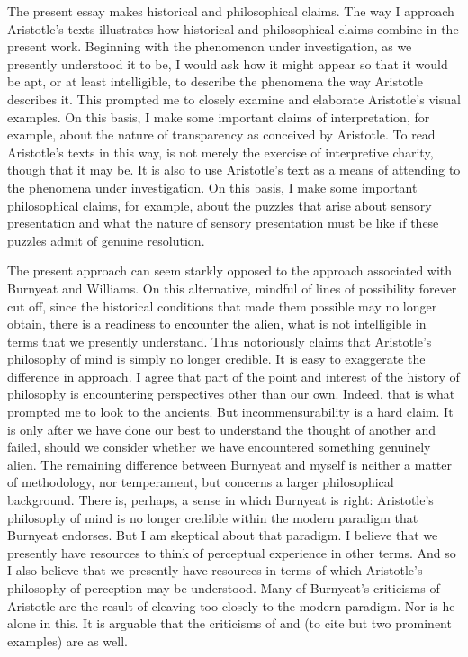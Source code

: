 The present essay makes historical and philosophical claims. The way I approach Aristotle's texts illustrates how historical and philosophical claims combine in the present work. Beginning with the phenomenon under investigation, as we presently understood it to be, I would ask how it might appear so that it would be apt, or at least intelligible, to describe the phenomena the way Aristotle describes it. This prompted me to closely examine and elaborate Aristotle's visual examples. On this basis, I make some important claims of interpretation, for example, about the nature of transparency as conceived by Aristotle. To read Aristotle's texts in this way, is not merely the exercise of interpretive charity, though that it may be. It is also to use Aristotle's text as a means of attending to the phenomena under investigation. On this basis, I make some important philosophical claims, for example, about the puzzles that arise about sensory presentation and what the nature of sensory presentation must be like if these puzzles admit of genuine resolution.

The present approach can seem starkly opposed to the approach associated with Burnyeat and Williams. On this alternative, mindful of lines of possibility forever cut off, since the historical conditions that made them possible may no longer obtain, there is a readiness to encounter the alien, what is not intelligible in terms that we presently understand. Thus \citet{Burnyeat:1992fk} notoriously claims that Aristotle's philosophy of mind is simply no longer credible. It is easy to exaggerate the difference in approach. I agree that part of the point and interest of the history of philosophy is encountering perspectives other than our own. Indeed, that is what prompted me to look to the ancients. But incommensurability is a hard claim. It is only after we have done our best to understand the thought of another and failed, should we consider whether we have encountered something genuinely alien. The remaining difference between Burnyeat and myself is neither a matter of methodology, nor temperament, but concerns a larger philosophical background. There is, perhaps, a sense in which Burnyeat is right: Aristotle's philosophy of mind is no longer credible within the modern paradigm that Burnyeat endorses. But I am skeptical about that paradigm. I believe that we presently have resources to think of perceptual experience in other terms. And so I also believe that we presently have resources in terms of which Aristotle's philosophy of perception may be understood. Many of Burnyeat's criticisms of Aristotle are the result of cleaving too closely to the modern paradigm. Nor is he alone in this. It is arguable that the criticisms of \citet{Broadie:1993fk} and \citet{Sorabji:1971fr} (to cite but two prominent examples) are as well.

